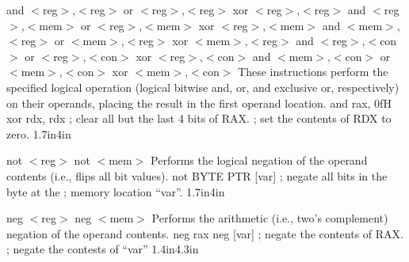 {and $<$reg$>$,$<$reg$>$ \hspace{0.25in} or $<$reg$>$,$<$reg$>$ \hspace{0.25in} xor $<$reg$>$,$<$reg$>$ \newline
and $<$reg$>$,$<$mem$>$ \hspace{0.25in} or $<$reg$>$,$<$mem$>$ \hspace{0.25in} xor $<$reg$>$,$<$mem$>$ \newline
and $<$mem$>$,$<$reg$>$ \hspace{0.25in} or $<$mem$>$,$<$reg$>$ \hspace{0.25in} xor $<$mem$>$,$<$reg$>$ \newline
and $<$reg$>$,$<$con$>$ \hspace{0.25in} or $<$reg$>$,$<$con$>$ \hspace{0.25in} xor $<$reg$>$,$<$con$>$ \newline
and $<$mem$>$,$<$con$>$ \hspace{0.25in} or $<$mem$>$,$<$con$>$ \hspace{0.25in} xor $<$mem$>$,$<$con$>$}
{These instructions perform the specified logical operation (logical
bitwise and, or, and exclusive or, respectively) on their operands,
placing the result in the first operand location.}
{and rax, 0fH \newline xor rdx, rdx}
{; clear all but the last 4 bits of RAX. \newline ; set the contents of RDX to zero.}
{1.7in}{4in}

{not $<$reg$>$ \newline not $<$mem$>$}
{Performs the logical negation of the operand contents (i.e., flips all bit values).}
{not BYTE PTR [var]}
{; negate all bits in the byte at the \newline ; memory location ``var''.}
{1.7in}{4in}

{neg $<$reg$>$ \newline neg $<$mem$>$}
{Performs the arithmetic (i.e., two's complement) negation of the operand contents.}
{neg rax \newline neg [var]}
{; negate the contents of RAX. \newline ; negate the contests of ``var''}
{1.4in}{4.3in}

